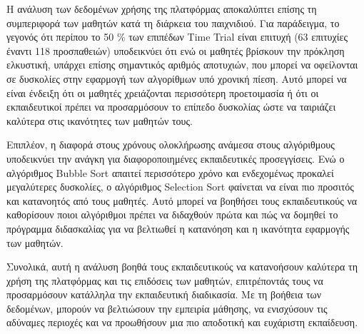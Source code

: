 Η ανάλυση των δεδομένων χρήσης της πλατφόρμας αποκαλύπτει επίσης τη συμπεριφορά των μαθητών κατά τη διάρκεια του παιχνιδιού. Για παράδειγμα, το γεγονός ότι περίπου το 50 \% των επιπέδων Time Trial είναι επιτυχή (63 επιτυχίες έναντι 118 προσπαθειών) υποδεικνύει ότι ενώ οι μαθητές βρίσκουν την πρόκληση ελκυστική, υπάρχει επίσης σημαντικός αριθμός αποτυχιών, που μπορεί να οφείλονται σε δυσκολίες στην εφαρμογή των αλγορίθμων υπό χρονική πίεση. Αυτό μπορεί να είναι ένδειξη ότι οι μαθητές χρειάζονται περισσότερη προετοιμασία ή ότι οι εκπαιδευτικοί πρέπει να προσαρμόσουν το επίπεδο δυσκολίας ώστε να ταιριάζει καλύτερα στις ικανότητες των μαθητών τους.

Επιπλέον, η διαφορά στους χρόνους ολοκλήρωσης ανάμεσα στους αλγόριθμους υποδεικνύει την ανάγκη για διαφοροποιημένες εκπαιδευτικές προσεγγίσεις. Ενώ ο αλγόριθμος Bubble Sort απαιτεί περισσότερο χρόνο και ενδεχομένως προκαλεί μεγαλύτερες δυσκολίες, ο αλγόριθμος Selection Sort φαίνεται να είναι πιο προσιτός και κατανοητός από τους μαθητές. Αυτό μπορεί να βοηθήσει τους εκπαιδευτικούς να καθορίσουν ποιοι αλγόριθμοι πρέπει να διδαχθούν πρώτα και πώς να δομηθεί το πρόγραμμα διδασκαλίας για να βελτιωθεί η κατανόηση και η ικανότητα εφαρμογής των μαθητών.

Συνολικά, αυτή η ανάλυση βοηθά τους εκπαιδευτικούς να κατανοήσουν καλύτερα τη χρήση της πλατφόρμας και τις επιδόσεις των μαθητών, επιτρέποντάς τους να προσαρμόσουν κατάλληλα την εκπαιδευτική διαδικασία. Με τη βοήθεια των δεδομένων, μπορούν να βελτιώσουν την εμπειρία μάθησης, να ενισχύσουν τις αδύναμες περιοχές και να προωθήσουν μια πιο αποδοτική και ευχάριστη εκπαίδευση.
